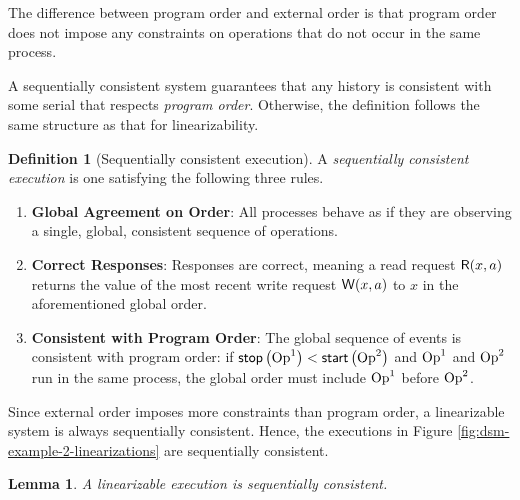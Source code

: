 \documentclass[]             %
{NASA}                       %
\newtheorem{lemma}[theorem]{Lemma}
\theoremstyle{definition}
\newtheorem{definition}[theorem]{Definition}
\providecommand{\tightlist}{%
  \setlength{\itemsep}{0pt}\setlength{\parskip}{0pt}}
\begin{document}
The difference between program order and external order is that
program order does not impose any constraints on operations that do
not occur in the same process.

A sequentially consistent system guarantees that any history is
consistent with some serial that respects \emph{program
  order}. Otherwise, the definition follows the same structure as that
for linearizability.


\begin{definition}[Sequentially consistent execution]
  \label{def:sequentially-consistent-execution}
  A \emph{sequentially consistent execution} is one satisfying the following three rules.
\begin{enumerate}
  \tightlist
\item \textbf{Global Agreement on Order}: All processes behave as if
  they are observing a single, global, consistent sequence of
  operations.
\item \textbf{Correct Responses}: Responses are correct, meaning a read request
  \(\mathsf{R}\!\left(x, a\right)\) returns the value of the most recent write request
  \(\mathsf{W}\!\left(x, a\right)\) to \(x\) in the aforementioned global order.
\item \textbf{Consistent with Program Order}: The global sequence of
  events is consistent with program order: if
  $\mathsf{stop}\left(\mathrm{Op}^1\right) < \mathsf{start}\left(\mathrm{Op}^2\right)$ and $\mathrm{Op}^1$ and $\mathrm{Op}^2$ run in
  the same process, the global order must include $\mathrm{Op}^1$ before
  $\mathrm{Op}^2$.
\end{enumerate}
\end{definition}

Since external order imposes more constraints than program order, a
linearizable system is always sequentially consistent. Hence, the
executions in Figure \ref{fig:dsm-example-2-linearizations} are
sequentially consistent.
\begin{lemma}
  \label{lem:linearsequential}
  A linearizable execution is sequentially consistent.
\end{lemma}
\end{document}
